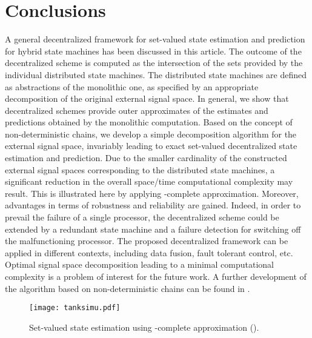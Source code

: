 \documentclass[a4paper, 10pt, conference]{ieeeconf}
\begin{document}
\section{Conclusions}
A general decentralized framework for set-valued state estimation and prediction for hybrid state machines has been discussed in this article. The outcome of the decentralized scheme is computed as the intersection of the sets provided by  the individual distributed state machines. The distributed state machines are defined as abstractions of the monolithic one, as specified by an appropriate decomposition of the original external signal space. In general, we show that decentralized schemes provide outer approximates of the estimates and predictions obtained by the monolithic computation.
Based on the concept of non-deterministic chains, we develop a simple decomposition algorithm for the external signal space, invariably leading to exact set-valued decentralized state estimation and prediction.
Due to the smaller cardinality of the constructed external signal spaces corresponding to the distributed state machines,
a significant reduction in the overall space/time computational complexity may result. This is illustrated here by applying -complete approximation. Moreover, advantages in terms of robustness and reliability are gained. Indeed, in order to prevail the failure of a single processor, the decentralized scheme could be extended by a redundant state machine and a failure detection for switching off the malfunctioning processor. The proposed decentralized framework can be applied in different contexts, including data fusion, fault tolerant control, etc. Optimal signal space decomposition leading to a minimal computational complexity is a problem of interest for the future work. A further development of the algorithm based on non-deterministic chains can be found  in \cite{bajc_rom:2011}.





\begin{figure}[t]
\centering
\texttt{[image: tanksimu.pdf]}
\vspace{-10pt}
\caption{Set-valued state estimation using -complete approximation ().}
\label{fig:sim}
\vspace{-15pt}
\end{figure}






\end{document}
